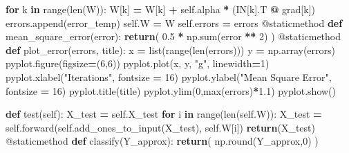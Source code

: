\documentclass[
]{book}
\newenvironment{Shaded}{\begin{snugshade}}{\end{snugshade}}
\newcommand{\AttributeTok}[1]{\textcolor[rgb]{0.77,0.63,0.00}{#1}}
\newcommand{\BuiltInTok}[1]{#1}
\newcommand{\ControlFlowTok}[1]{\textcolor[rgb]{0.13,0.29,0.53}{\textbf{#1}}}
\newcommand{\DecValTok}[1]{\textcolor[rgb]{0.00,0.00,0.81}{#1}}
\newcommand{\FloatTok}[1]{\textcolor[rgb]{0.00,0.00,0.81}{#1}}
\newcommand{\KeywordTok}[1]{\textcolor[rgb]{0.13,0.29,0.53}{\textbf{#1}}}
\newcommand{\NormalTok}[1]{#1}
\newcommand{\OperatorTok}[1]{\textcolor[rgb]{0.81,0.36,0.00}{\textbf{#1}}}
\newcommand{\StringTok}[1]{\textcolor[rgb]{0.31,0.60,0.02}{#1}}
\newcommand{\VariableTok}[1]{\textcolor[rgb]{0.00,0.00,0.00}{#1}}
\begin{document}
\begin{Shaded}
\begin{Highlighting}[]
        \ControlFlowTok{for}\NormalTok{ k }\KeywordTok{in} \BuiltInTok{range}\NormalTok{(}\BuiltInTok{len}\NormalTok{(W)):}
\NormalTok{          W[k] }\OperatorTok{=}\NormalTok{ W[k] }\OperatorTok{+} \VariableTok{self}\NormalTok{.alpha }\OperatorTok{*}\NormalTok{ (IN[k].T }\OperatorTok{@}\NormalTok{ grad[k])}
\NormalTok{      errors.append(error\_temp)}
    \VariableTok{self}\NormalTok{.W }\OperatorTok{=}\NormalTok{ W}
    \VariableTok{self}\NormalTok{.errors }\OperatorTok{=}\NormalTok{ errors}
  \AttributeTok{@staticmethod}
  \KeywordTok{def}\NormalTok{ mean\_square\_error(error):}
    \ControlFlowTok{return}\NormalTok{( }\FloatTok{0.5} \OperatorTok{*}\NormalTok{ np.}\BuiltInTok{sum}\NormalTok{(error }\OperatorTok{**} \DecValTok{2}\NormalTok{) )}
  \AttributeTok{@staticmethod}
  \KeywordTok{def}\NormalTok{ plot\_error(errors, title):}
\NormalTok{    x }\OperatorTok{=} \BuiltInTok{list}\NormalTok{(}\BuiltInTok{range}\NormalTok{(}\BuiltInTok{len}\NormalTok{(errors)))}
\NormalTok{    y }\OperatorTok{=}\NormalTok{ np.array(errors)}
\NormalTok{    pyplot.figure(figsize}\OperatorTok{=}\NormalTok{(}\DecValTok{6}\NormalTok{,}\DecValTok{6}\NormalTok{))}
\NormalTok{    pyplot.plot(x, y, }\StringTok{"g"}\NormalTok{, linewidth}\OperatorTok{=}\DecValTok{1}\NormalTok{)}
\NormalTok{    pyplot.xlabel(}\StringTok{"Iterations"}\NormalTok{, fontsize }\OperatorTok{=} \DecValTok{16}\NormalTok{)}
\NormalTok{    pyplot.ylabel(}\StringTok{"Mean Square Error"}\NormalTok{, fontsize }\OperatorTok{=} \DecValTok{16}\NormalTok{)}
\NormalTok{    pyplot.title(title)}
\NormalTok{    pyplot.ylim(}\DecValTok{0}\NormalTok{,}\BuiltInTok{max}\NormalTok{(errors)}\OperatorTok{*}\FloatTok{1.1}\NormalTok{)}
\NormalTok{    pyplot.show()}
    
  \KeywordTok{def}\NormalTok{ test(}\VariableTok{self}\NormalTok{):}
\NormalTok{    X\_test }\OperatorTok{=} \VariableTok{self}\NormalTok{.X\_test}
    \ControlFlowTok{for}\NormalTok{ i }\KeywordTok{in} \BuiltInTok{range}\NormalTok{(}\BuiltInTok{len}\NormalTok{(}\VariableTok{self}\NormalTok{.W)):}
\NormalTok{      X\_test }\OperatorTok{=} \VariableTok{self}\NormalTok{.forward(}\VariableTok{self}\NormalTok{.add\_ones\_to\_input(X\_test), }\VariableTok{self}\NormalTok{.W[i])}
    \ControlFlowTok{return}\NormalTok{(X\_test)}
  \AttributeTok{@staticmethod}
  \KeywordTok{def}\NormalTok{ classify(Y\_approx):}
    \ControlFlowTok{return}\NormalTok{( np.}\BuiltInTok{round}\NormalTok{(Y\_approx,}\DecValTok{0}\NormalTok{) )}
\end{Highlighting}
\end{Shaded}
\end{document}
